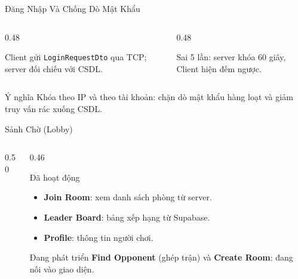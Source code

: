 \begin{frame}{Đăng Nhập Và Chống Dò Mật Khẩu}
  \begin{columns}[T]
    \begin{column}{0.48\textwidth}
      \centering
      \par\vspace{2pt}\scriptsize Client gửi \texttt{LoginRequestDto} qua TCP; server đối chiếu với CSDL.
    \end{column}
    \begin{column}{0.48\textwidth}
      \centering
      \par\vspace{2pt}\scriptsize Sai 5 lần: server khóa 60 giây, Client hiện đếm ngược.
    \end{column}
  \end{columns}
  \vspace{0.25cm}
  \begin{exampleblock}{Ý nghĩa}
    \footnotesize Khóa theo IP và theo tài khoản: chặn dò mật khẩu hàng loạt và giảm truy vấn rác xuống CSDL.
  \end{exampleblock}
\end{frame}

\begin{frame}{Sảnh Chờ (Lobby)}
  \begin{columns}[T]
    \begin{column}{0.50\textwidth}
      \centering
    \end{column}
    \begin{column}{0.46\textwidth}
      \begin{block}{Đã hoạt động}
        \begin{itemize}
          \item \textbf{Join Room}: xem danh sách phòng từ server.
          \item \textbf{Leader Board}: bảng xếp hạng từ Supabase.
          \item \textbf{Profile}: thông tin người chơi.
        \end{itemize}
      \end{block}
      \begin{alertblock}{Đang phát triển}
        \footnotesize \textbf{Find Opponent} (ghép trận) và \textbf{Create Room}: đang nối vào giao diện.
      \end{alertblock}
    \end{column}
  \end{columns}
\end{frame}

